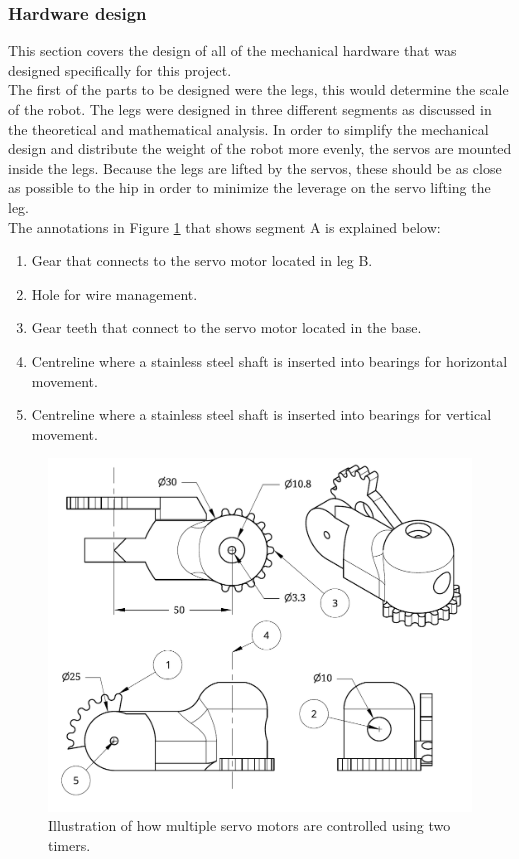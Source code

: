 \subsubsection{Hardware design}
This section covers the design of all of the mechanical hardware that was designed specifically for this project.\\

The first of the parts to be designed were the legs, this would determine the scale of the robot. The legs were designed in three different segments as discussed in the theoretical and mathematical analysis. In order to simplify the mechanical design and distribute the weight of the robot more evenly, the servos are mounted inside the legs. Because the legs are lifted by the servos, these should be as close as possible to the hip in order to minimize the leverage on the servo lifting the leg.\\

The annotations in Figure \ref{fig:DrawingA} that shows segment A is explained below:
\begin{enumerate}
\item Gear that connects to the servo motor located in leg B.
\item Hole for wire management.
\item Gear teeth that connect to the servo motor located in the base.
\item Centreline where a stainless steel shaft is inserted into bearings for horizontal movement.
\item Centreline where a stainless steel shaft is inserted into bearings for vertical movement.
\end{enumerate}

\begin{figure}[H]
\centering
\includegraphics[scale = 0.8]{pics/DrawingA.pdf}
\caption{Illustration of how multiple servo motors are controlled using two timers.}
\label{fig:DrawingA}
\end{figure}

